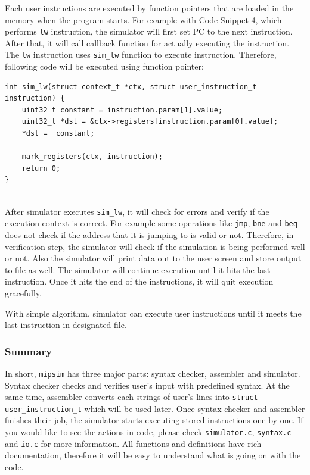 \documentclass{homework}
\begin{document}
Each user instructions are executed by function pointers that are loaded in the memory when the program starts. For example with Code Snippet 4, which performs \texttt{lw} instruction, the simulator will first set PC to the next instruction. After that, it will call callback function for actually executing the instruction. The \texttt{lw} instruction uses \texttt{sim_lw} function to execute instruction. Therefore, following code will be executed using function pointer:
\\
\begin{center}
\begin{code}
\begin{verbatim}
int sim_lw(struct context_t *ctx, struct user_instruction_t instruction) {
    uint32_t constant = instruction.param[1].value;
    uint32_t *dst = &ctx->registers[instruction.param[0].value];
    *dst =  constant;

    mark_registers(ctx, instruction);
    return 0;
}
\end{verbatim}
\end{code}
\end{center}
\\
After simulator executes \texttt{sim_lw}, it will check for errors and verify if the execution context is correct. For example some operations like \texttt{jmp}, \texttt{bne} and \texttt{beq} does not check if the address that it is jumping to is valid or not. Therefore, in verification step, the simulator will check if the simulation is being performed well or not. Also the simulator will print data out to the user screen and store output to file as well. The simulator will continue execution until it hits the last instruction. Once it hits the end of the instructions, it will quit execution gracefully. 

With simple algorithm, simulator can execute user instructions until it meets the last instruction in designated file. 

\subsubsection{Summary}
In short, \texttt{mipsim} has three major parts: syntax checker, assembler and simulator. Syntax checker checks and verifies user's input with predefined syntax. At the same time, assembler converts each strings of user's lines into \texttt{struct user_instruction_t} which will be used later. Once syntax checker and assembler finishes their job, the simulator starts executing stored instructions one by one. If you would like to see the actions in code, please check \texttt{simulator.c}, \texttt{syntax.c} and \texttt{io.c} for more information. All functions and definitions have rich documentation, therefore it will be easy to understand what is going on with the code.
\pagebreak
\end{document}
